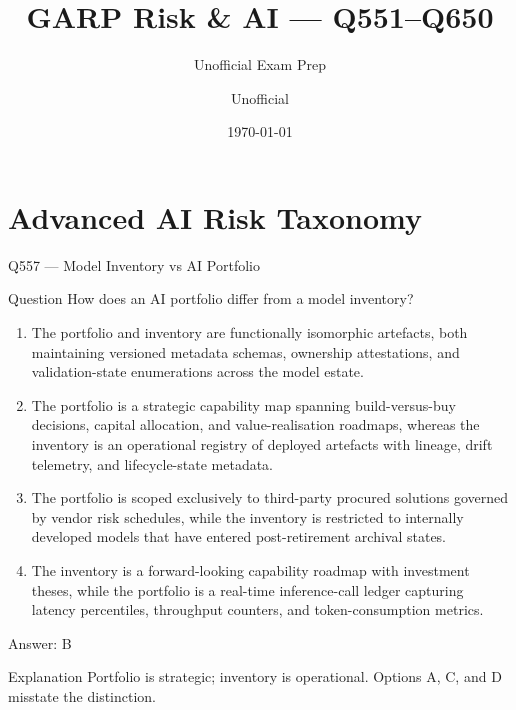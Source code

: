 \documentclass[aspectratio=169,8pt]{beamer}
\title[GARP RAI]{GARP Risk \& AI --- Q551--Q650}
\subtitle{Unofficial Exam Prep}
\author{Unofficial}
\date{\today}
\begin{document}
	
	\begin{frame}
		\titlepage
	\end{frame}
	
	\section{Advanced AI Risk Taxonomy}
	
	\begin{frame}{Q557 --- Model Inventory vs AI Portfolio}
		\begin{block}{Question}
			How does an AI portfolio differ from a model inventory?
			\begin{enumerate}
				\item The portfolio and inventory are functionally isomorphic artefacts, both maintaining versioned metadata schemas, ownership attestations, and validation-state enumerations across the model estate.
				\item The portfolio is a strategic capability map spanning build-versus-buy decisions, capital allocation, and value-realisation roadmaps, whereas the inventory is an operational registry of deployed artefacts with lineage, drift telemetry, and lifecycle-state metadata.
				\item The portfolio is scoped exclusively to third-party procured solutions governed by vendor risk schedules, while the inventory is restricted to internally developed models that have entered post-retirement archival states.
				\item The inventory is a forward-looking capability roadmap with investment theses, while the portfolio is a real-time inference-call ledger capturing latency percentiles, throughput counters, and token-consumption metrics.
			\end{enumerate}
		\end{block}
		\begin{exampleblock}{Answer: B}\end{exampleblock}
		\begin{block}{Explanation}
			Portfolio is strategic; inventory is operational. Options A, C, and D misstate the distinction.
		\end{block}
	\end{frame}
	
\end{document}
